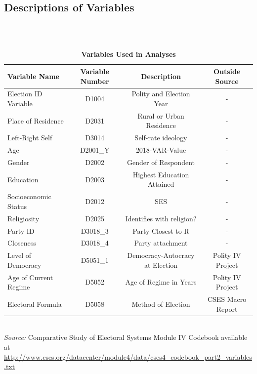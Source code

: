 \documentclass[12pt, titlepage]{article}
\newcommand\e{\emph}
\newcommand\tb{\textbf}
\begin{document}
\begin{appendices}
\clearpage 

\begin{landscape}
\section{Descriptions of Variables }
\label{AppendixA}

~~~\\\\

\begin{table}[h!]
	\centering
	\def\arraystretch{1.3}
	\caption{\tb{Variables Used in Analyses}}
	\begin{tabulary}{\linewidth}{l c c c}
		\\
		\hline
		\tb{Variable Name}& \tb{Variable Number} & \tb{Description}&\tb{Outside Source} \\
		\hline
		Election ID Variable &D1004&Polity and Election Year&-\\
		Place of Residence&D2031&Rural or Urban Residence&-\\
		Left-Right Self&D3014&Self-rate ideology &-\\
		Age&D2001\_Y&2018-VAR-Value&- \\
		Gender&D2002&Gender of Respondent&- \\
		Education&D2003&Highest Education Attained&- \\
		Socioeconomic Status&D2012&SES&- \\
		Religiosity&D2025&Identifies with religion?&-  \\
		Party ID&D3018\_3&Party Closest to R&- \\
		Closeness&D3018\_4&Party attachment&- \\
		Level of Democracy&D5051\_1&Democracy-Autocracy at Election&Polity IV Project\\
		Age of Current Regime&D5052&Age of Regime in Years& Polity IV Project\\
		Electoral Formula&D5058&Method of Election&CSES Macro Report\\
		\hline
	\end{tabulary}\\
	\e{Source:} Comparative Study of Electoral Systems Module IV Codebook available at \url{http://www.cses.org/datacenter/module4/data/cses4_codebook_part2_variables.txt}
	\label{table99}
\end{table}


\end{landscape}
\end{appendices}
\end{document}
